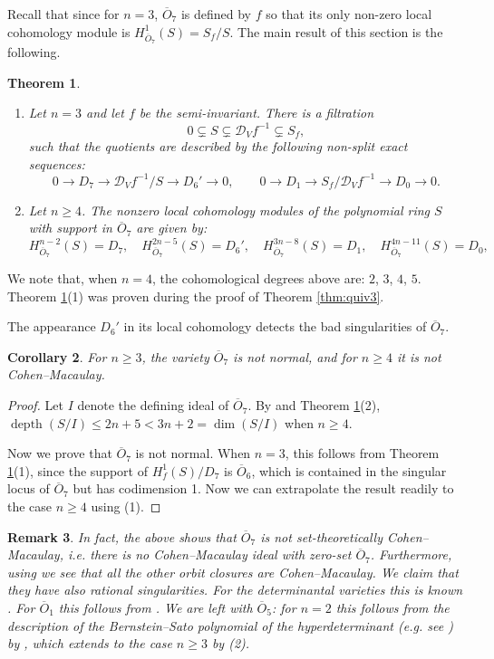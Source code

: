 \documentclass[11pt,reqno]{amsart}
\newcommand{\D}{\mathcal{D}}
\newcommand{\ol}[1]{\overline{#1}}
\newcommand{\op}[1]{\operatorname{#1}}
\newtheorem{theorem}{Theorem}[section]
\newtheorem{corollary}[theorem]{Corollary}
\newtheorem{remark}[theorem]{Remark}
\numberwithin{equation}{section}
\begin{document}
Recall that since for $n=3$, $\ol{O}_7$ is defined by $f$ so that its only non-zero local cohomology module is $H^1_{\ol{O}_7}(S)=S_f/S$. The main result of this section is the following. 

\begin{theorem}\label{loc07}
\begin{enumerate}
\item Let $n=3$ and let $f$ be the semi-invariant. There is a filtration
$$
0\subsetneq S \subsetneq \D_Vf^{-1}\subsetneq S_f,
$$
such that the quotients are described by the following non-split exact sequences:
$$
0\to D_7 \to \D_Vf^{-1}/S \to D_6'\to 0,\quad\quad 0\to D_1 \to S_f/\D_Vf^{-1}\to D_0 \to 0.
$$
\item Let $n\geq 4$. The nonzero local cohomology modules of the polynomial ring $S$ with support in $\ol{O}_7$ are given by:
$$
H^{n-2}_{\ol{O}_7}(S)=D_7,\quad H^{2n-5}_{\ol{O}_7}(S)=D_6',\quad H^{3n-8}_{\ol{O}_7}(S)=D_1,\quad H^{4n-11}_{\ol{O}_7}(S)=D_0,
$$	
\end{enumerate}

\end{theorem}

We note that, when $n=4$, the cohomological degrees above are: $2$, $3$, $4$, $5$. Theorem \ref{loc07}(1) was proven during the proof of Theorem \ref{thm:quiv3}.


The appearance $D_6'$ in its local cohomology detects the bad singularities of $\ol{O}_7$.

\begin{corollary}\label{cor:sing}
For $n\geq 3$, the variety $\ol{O}_7$ is not normal, and for $n\geq 4$ it is not Cohen--Macaulay.
\end{corollary}

\begin{proof}
Let $I$ denote the defining ideal of $\ol{O}_7$. By \cite[Proposition 3.2]{varbaro} and Theorem \ref{loc07}(2), $\op{depth}(S/I)\leq 2n+5 < 3n+2 = \dim(S/I)$ when $n\geq 4$.

Now we prove that $\ol{O}_7$ is not normal. When $n=3$, this follows from Theorem \ref{loc07}(1), since the support of $H^1_f(S)/D_7$ is $\ol{O}_6$, which is contained in the singular locus of $\ol{O}_7$ but has codimension 1. Now we can extrapolate the result readily to the case $n\geq 4$ using \cite[Theorem 1.4]{collapse}(1).
\end{proof}


\begin{remark}
In fact, the above shows that  $\ol{O}_7$ is not set-theoretically Cohen--Macaulay, i.e. there is no Cohen--Macaulay ideal with zero-set $\ol{O}_7$. Furthermore, using \cite[Theorem  3.1]{lovett} we see that all the other orbit closures are Cohen--Macaulay. We claim that they have also rational singularities. For the determinantal varieties this is known  \cite[Corollary 6.1.5]{weyman}. For $\ol{O}_1$ this follows from \cite[pg. 158, Exercise 8.]{weyman}. We are left with $\ol{O}_5$: for $n=2$ this follows from the description of the Bernstein--Sato polynomial of the hyperdeterminant (e.g. see \cite[Section 3.2]{perlman2020equivariant}) by \cite[Theorem 0.4]{saito}, which extends to the case $n\geq 3$ by \cite[Theorem 1.4]{collapse}(2). 
\end{remark}
\end{document}
